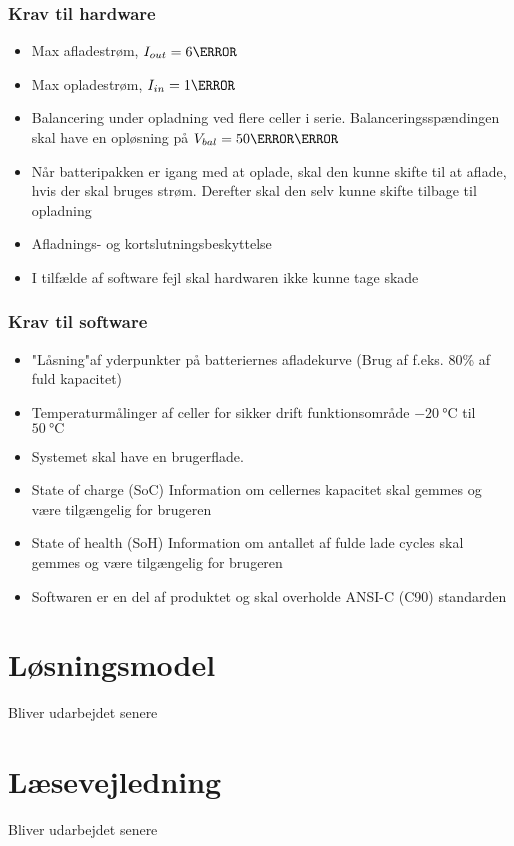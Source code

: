 \subsubsection{Krav til hardware}
\begin{itemize}[noitemsep]
	\item Max afladestrøm, $I_{out} = 6\ampere$
	\item Max opladestrøm, $I_{in} = 1\ampere$
	\item Balancering under opladning ved flere celler i serie. Balanceringsspændingen skal have en opløsning på  $V_{bal} = 50\milli\volt$
	\item Når batteripakken er igang med at oplade, skal den kunne skifte til at aflade, hvis der skal bruges strøm. Derefter skal den selv kunne skifte tilbage til opladning
	\item Afladnings- og kortslutningsbeskyttelse
	\item I tilfælde af software fejl skal hardwaren ikke kunne tage skade
\end{itemize}

\subsubsection{Krav til software}
\begin{itemize}[noitemsep]
	\item "Låsning"\space af yderpunkter på batteriernes afladekurve (Brug af f.eks. 80\% af fuld kapacitet)
	\item Temperaturmålinger af celler for sikker drift \textemdash \space funktionsområde $\SI{-20}{\celsius}$ til $\SI{50}{\celsius}$
	\item Systemet skal have en brugerflade.
	\item State of charge (SoC) \textemdash \space Information om cellernes kapacitet skal gemmes og være tilgængelig for brugeren
	\item State of health (SoH) \textemdash \space Information om antallet af fulde lade cycles skal gemmes og være tilgængelig for brugeren
	\item Softwaren er en del af produktet og skal overholde ANSI-C (C90) standarden
\end{itemize}


\section{Løsningsmodel}
Bliver udarbejdet senere

\section{Læsevejledning}
Bliver udarbejdet senere

